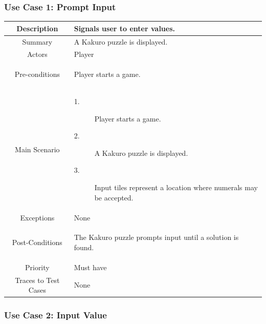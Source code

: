 \documentclass[12pt]{article}
\begin{document}
\newpage
\pagestyle{plain} 
\subsubsection{Use Case 1: Prompt Input} \label{uc:1}

\begin{table}[htbp]
\begin{center}
\begin{tabular}{| c | m{10cm} |}
\hline
\cellcolor{lightgray}Description & Signals user to enter values. \\
\hline
\cellcolor{lightgray}Summary & A Kakuro puzzle is displayed. \\
\hline
\cellcolor{lightgray}Actors & Player \\
\hline
\cellcolor{lightgray}Pre-conditions &
\begin{description}[font=$\bullet$~\normalfont\scshape]
\item Player starts a game.
\end{description}\\
\hline
\cellcolor{lightgray}Main Scenario & 
\begin{description}
\item [1.]Player starts a game.
\item [2.]A Kakuro puzzle is displayed. 
\item [3.]Input tiles represent a location where numerals may be accepted.
\end{description}\\
\hline
\cellcolor{lightgray}Exceptions & None \\
\hline
\cellcolor{lightgray}Post-Conditions & 
\begin{description}[font=$\bullet$~\normalfont\scshape]
\item The Kakuro puzzle prompts input until a solution is found.
\end{description}\\
\hline
\cellcolor{lightgray}Priority & Must have \\
\hline
\cellcolor{lightgray}Traces to Test Cases & None \\
\hline
\end{tabular}
\end{center}
\end{table}

\newpage
\pagestyle{plain} 
\subsubsection{Use Case 2: Input Value} \label{uc:1}
\end{document}
